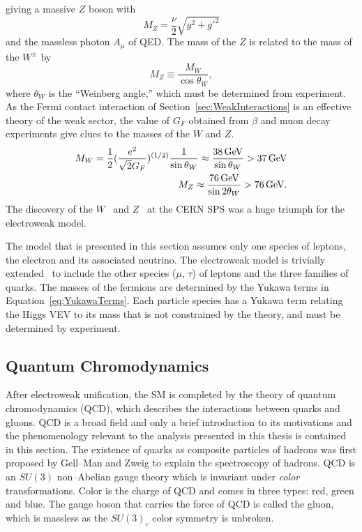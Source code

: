 giving a massive $Z$ boson with 
\begin{equation}
  M_Z = \frac{\nu}{2}\sqrt{g^2 + g'^2} 
  \label{eq:ZBosonMass}
\end{equation}
and the massless photon $A_\mu$ of QED\@.  The mass of the $Z$ is related to the
mass of the $W^\pm$ by 
\begin{equation}
  M_Z \equiv \frac{M_W}{\cos \theta_W},
  \nonumber
\end{equation}
where $\theta_W$ is the ``Weinberg angle,'' which must be determined from
experiment.  As the Fermi contact interaction of
Section~\ref{sec:WeakInteractions} is an effective theory of the weak sector,
the value of $G_F$ obtained from $\beta$ and muon decay experiments give clues
to the masses of the $W$ and $Z$.  
\begin{eqnarray}
  M_W = \frac{1}{2}(\frac{e^2}{\sqrt 2 G_F})^{(1/2)}\frac{1}{\sin\theta_W} \approx
  \frac{38 \,\text{Ge\hspace{-.08em}V}}{\sin\theta_W} > 37 \,\text{Ge\hspace{-.08em}V} \nonumber \\ 
  M_Z \approx \frac{76 \,\text{Ge\hspace{-.08em}V}}{\sin
  2\theta_W} > 76\,\text{Ge\hspace{-.08em}V}\nonumber.
\end{eqnarray}
The discovery of the $W$~\cite{UA1WDiscovery,UA2WDiscovery} and
$Z$~\cite{UA1ZDiscovery, UA2ZDiscovery} at the CERN SPS was a huge triumph for
the electroweak model.

The model that is presented in this section assumes only one species of leptons,
the electron and its associated neutrino.  The electroweak model is trivially
extended~\cite{Morii:SMandBSM} to include the other species ($\mu$, $\tau$) of
leptons and the three families of quarks. The masses of the fermions are
determined by the Yukawa terms in Equation~\ref{eq:YukawaTerms}.  Each particle
species has a Yukawa term relating the Higgs VEV to its mass that is not
constrained by the theory, and must be determined by experiment.

\subsection{Quantum Chromodynamics}

After electroweak unification, the SM is completed by the theory of
quantum chromodynamics (QCD), which describes the interactions between quarks
and gluons.  QCD is a broad field and only a brief introduction to its
motivations and the phenomenology relevant to the analysis presented in this
thesis is contained in this section.  The existence of quarks as composite
particles of hadrons was first proposed by Gell--Man and Zweig to explain the
spectroscopy of hadrons.  QCD is an $SU(3)$ non--Abelian gauge theory which is
invariant under \emph{color} transformations.  Color is the charge of QCD and
comes in three types: red, green and blue.  The gauge boson that carries the
force of QCD is called the gluon, which is massless as the $SU(3)_c$ color
symmetry is unbroken.

